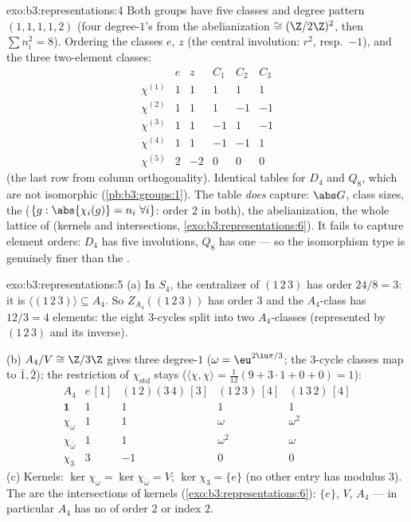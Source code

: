 \begin{solution}{exo:b3:representations:4}
Both groups have five classes and degree pattern $(1,1,1,1,2)$
(four degree-$1$'s from the abelianization $\cong (\Z/2\Z)^2$,
then $\sum n_i^2 = 8$). Ordering the classes $e$, $z$ (the
central involution: $r^2$, resp.\ $-1$), and the three
two-element classes:
\[
\begin{array}{c|ccccc}
& e & z & C_1 & C_2 & C_3\\
\hline
\chi^{(1)} & 1 & 1 & 1 & 1 & 1\\
\chi^{(2)} & 1 & 1 & 1 & -1 & -1\\
\chi^{(3)} & 1 & 1 & -1 & 1 & -1\\
\chi^{(4)} & 1 & 1 & -1 & -1 & 1\\
\chi^{(5)} & 2 & -2 & 0 & 0 & 0
\end{array}
\]
(the last row from column orthogonality). Identical tables for
$D_4$ and $Q_8$, which are not isomorphic
(\cref{pb:b3:groups:1}). The table \emph{does} capture: $\abs
G$, class sizes, the  ($\{g : \abs{\chi_i(g)} = n_i\
\forall i\}$: order $2$ in both), the abelianization, the whole
lattice of  (kernels and intersections,
\cref{exo:b3:representations:6}). It fails to capture element
orders: $D_4$ has five involutions, $Q_8$ has one --- so the
isomorphism type is genuinely finer than the .
\end{solution}

\begin{solution}{exo:b3:representations:5}
(a) In $S_4$, the centralizer of $(1\,2\,3)$ has order $24/8 =
3$: it is $\langle(1\,2\,3)\rangle \subseteq A_4$. So
$Z_{A_4}((1\,2\,3))$ has order $3$ and the $A_4$-class has $12/3
= 4$ elements: the eight $3$-cycles split into two $A_4$-classes
(represented by $(1\,2\,3)$ and its inverse).

(b) $A_4/V \cong \Z/3\Z$ gives three degree-$1$ 
($\omega = \eu^{2\iu\pi/3}$; the $3$-cycle classes map to
$\bar1, \bar2$); the restriction of $\chi_{\mathrm{std}}$
stays  ($\langle\chi,\chi\rangle = \frac1{12}(9 + 3
\cdot 1 + 0 + 0) = 1$):
\[
\begin{array}{c|cccc}
A_4 & e\,[1] & (1\,2)(3\,4)\,[3] & (1\,2\,3)\,[4] &
(1\,3\,2)\,[4]\\
\hline
\mathbf 1 & 1 & 1 & 1 & 1\\
\chi_\omega & 1 & 1 & \omega & \omega^2\\
\chi_{\bar\omega} & 1 & 1 & \omega^2 & \omega\\
\chi_3 & 3 & -1 & 0 & 0
\end{array}
\]
(c) Kernels: $\ker\chi_\omega = \ker\chi_{\bar\omega} = V$;
$\ker\chi_3 = \{e\}$ (no other entry has modulus $3$). The
 are the intersections of kernels
(\cref{exo:b3:representations:6}): $\{e\}$, $V$, $A_4$ --- in
particular $A_4$ has no  of order $2$ or index
$2$.
\end{solution}

